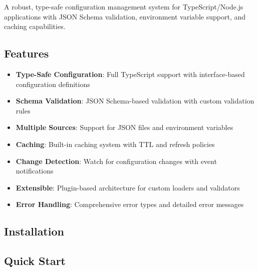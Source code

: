A robust, type-safe configuration management system for
TypeScript/Node.js applications with JSON Schema validation, environment
variable support, and caching capabilities.

\hypertarget{features-1}{%
\subsection{Features}\label{features-1}}

\begin{itemize}
\tightlist
\item
  \textbf{Type-Safe Configuration}: Full TypeScript support with
  interface-based configuration definitions
\item
  \textbf{Schema Validation}: JSON Schema-based validation with custom
  validation rules
\item
  \textbf{Multiple Sources}: Support for JSON files and environment
  variables
\item
  \textbf{Caching}: Built-in caching system with TTL and refresh
  policies
\item
  \textbf{Change Detection}: Watch for configuration changes with event
  notifications
\item
  \textbf{Extensible}: Plugin-based architecture for custom loaders and
  validators
\item
  \textbf{Error Handling}: Comprehensive error types and detailed error
  messages
\end{itemize}

\hypertarget{installation-1}{%
\subsection{Installation}\label{installation-1}}

\begin{Shaded}
\begin{Highlighting}[]
\end{Highlighting}
\end{Shaded}

\hypertarget{quick-start-1}{%
\subsection{Quick Start}\label{quick-start-1}}

